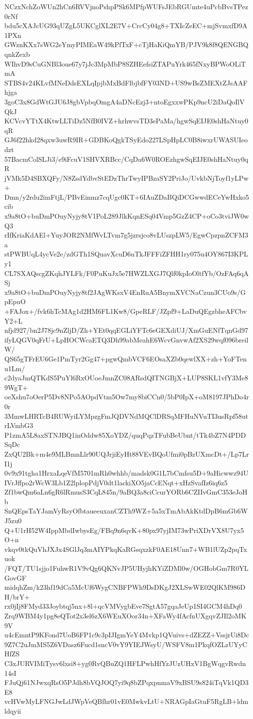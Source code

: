 NCzxNchZoWUn2hCn6RVVjnoPshpPSk6MPfpWUFsJEbRGUmte4uPcbBvsTPez0rNf
bdu5cXAJcUG93qUZgL5UKCglXL2E7V+CrcCy04g8+TXIcZeEC+mjSvmxfD9A1PXn
GWznKXx7sWG2eYmyPIMEaW49kPfTxF+cTjHaKiQmYB/PJV9k8f8QENGBQqnkZexb
WIhvD9sCuGNBl3oue67y7jJc3MpMbP8SZHEefsiZTAPuYrk465fNxyBPWoOLiTmA
STBS4v24KLvfMNeDdsEXLqIpjbMxBdFlbjbfFY03ND+US9wBsZMEXtZJsAAFhjga
3goC3x8GdWtGJU6J8gbVpbqOmgA4aDNcEzj3+ntoEgxxwPKp9ncU2iDaQoIlVQkJ
KCVcvYTtX4KtwLLTiDz5NfB0IVZ+hrhwvsTD3ePaMa/hgwSqEIJE0shHaNtuy0qR
GJ6f22hkd28qxw3uwR9IR+GDBKoQgkTSyEdo227LSpHpLC0B8iwxrUWASUIeodzt
57BacmColSLJi3/e9iFcuV1SHVXRBcc/CqDa6W0ROEzhgwSqEIJE0shHaNtuy0qR
jVMk5D4SBXQFy/N8ZsdYdbvStEDzThrTwyIPBzaSY2PriJo/UvkbNjToyf1yLPw+
Dmn/y2rdu2imFtjL/PBvEinmz7cqUgc0KT+6IAuZDaBQiDCGwwdECeYwHxko5cib
x9a8tO+buDmPOuyNyjy8tV1PoL289JlkKqnESq04Vmp5GzZ4CP+oCo3tviJW0wQ3
rIfKriaKdAEl+YuyJOR2NMfWvLTvm7g5jzrsjco8vLUszpLW5/EgwCpzpnZCFM3a
stPWBUqL4ycVe2e/zdGTh1SQuavXcuD6uTkJFFFiZFHH1ry075u4OY867I3KPLy1
CL7SXAQscgZKqhJYLFk/F0PuKuJx5e7HWZLXGJ7Qlf0kpIoOltfYb/OzFAq6qASj
x9a8tO+buDmPOuyNyjy8tf2JAgWKsxV4EnRuA5BnymXVCNaCzun3CUo9s/GpEpuO
+FAJox+/fvk6hTcMAg1d2HM6FL1Kw8/GpeRLF/JZpf9+LaDuQEgzbheAFCbvY2+L
nfjd927/bn2J78jc9nZljD/Zh+YEt0qqEGLiYFTc6eGEXdiUJ/XmGuENfTqnGd97
ifyLQGV0qFrU+LpHOCWcaETQ3Dh99abMeahE6WcvGnvwAf2XS29wqf096breilW/
QS65gTFrEU6Ge1PmTyr2Gg47+pgwQmbVCF6EOsaXZb0qewlXX+zh+YoFTenu1Lm/
c2dyaJmQTKdS5PuYl6RxOUoeJmnZC08ARsdQITNGBjX+LUP8SKL1vfY3Me89WgT+
oeXshu7oOerP5Dv8NPo5AOpdVtm5Ow7my8biCCn0/5bP0IpX+oM8197JPhDo4r0r
3MmwLHRTcB4RUWyiLYMpzgFmJQDVNdMQClDRSqMFHuNVuTI3usRpf58utrLVmbG3
P1zmA5L8axSTNJBQ1inOddw85XoYDZ/quqPqzTFubBeUbnt/tTk4bZ7N4PDDSqDc
ZxQU2Bk+m4e9MLBmnLlr90UQJrjiEyHt88VEvBQoUfmi0pBzUXmcDt+/Lp7LrI1j
0v9x91tgha1HrxaLqeVfM5701mRh0whhb/madsk0G1L7bCmfsu5D+9aHicwwz94U
IVrJffpo2rWcW3Lb1Z2lplopPdjV0dt1lackiXO5jaCcENqt+xHzSvafIz6iq6z5
Zf1bwQm6aLn6gR6lRmusS3CqL845n/9aBQ3a8ciCcurYORb6CZIIvGmC353eJoHb
SnQEpsTaYJamVyRsyOfbtaueeuxanCZTh9WZ+5a5xTmAbAkKtdDpB6mGb6WJ5zu0
Q+U1rH52W4IppMbdIwbysEg/FBq9n6qvK+80px97yjIM73wPriXDrVX8U7yx5O+n
vkqv0tkQuVhJXJx4SGlJq3mAIYPkqKaRGsqxzkF0AE18Unn7+WB1lUZp2pqTxuok
/FQT/TU1sjjo1FuhwR1V9vQg6QKNvJP5UHyjhKYiZDMl0w/OGHobGm7R0YLGovGF
midqhZm/k23hf19dCa5McUf6WygCNBFPWh9DsDKgJ2XLSwWE02QlKM986DH/brY+
rx0jIj8FMyd33Joybtqj5nx+8l+qcVMVygbEve7SgtA57gqaJeUp1SI4GCM4hDq0
Zrq9WBM4y1pg8eQTot2x3el6zX6WEuXOor34n+XFaWy4fAcfnUXgqvZJIl2oMK9V
u4cEmntP9KFond7UoB6FP1c9c3pIJIgmYeY4Mvkp1QVuivs+dZEZZ+VssjrUi8Dc
9Z7C2uJmMS5Z6VDasz6Fucd1sncV0vY9YIEJWsyU/WSFV8m1PkqfOZLzUYyCHfZS
C3xJURVIMiTysv6lxsi8+yg0RvQBuZQ1HFLPwhHfYzJUzUHxV1BgWqgvRwdn14sI
FJuQj61NJwxqRsO5PJdh8bVQJOQ7yi9q8bZPqxpnmaV9xBSU9s824iTqVk1QD3E8
vcHVwMyLFNGJwLdJWpVeQBfhr01vE0MwkvLtU+NRAGpIaGtuF5RgLB+ldmldqyii
